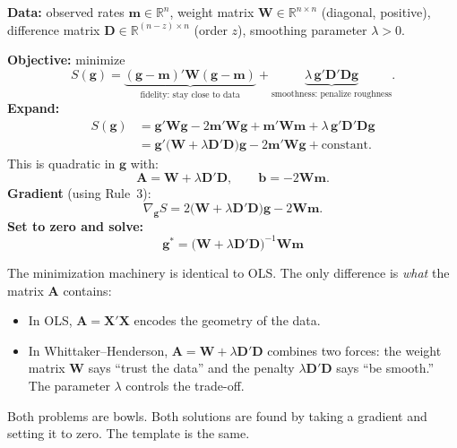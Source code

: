 \documentclass[11pt,a4paper]{article}
\begin{document}
\begin{formaldef}
\textbf{Data:} observed rates $\bm{m} \in \mathbb{R}^n$, weight matrix $\bm{W} \in \mathbb{R}^{n \times n}$ (diagonal, positive), difference matrix $\bm{D} \in \mathbb{R}^{(n-z) \times n}$ (order $z$), smoothing parameter $\lambda > 0$.

\textbf{Objective:} minimize
\[
S(\bm{g}) = \underbrace{(\bm{g} - \bm{m})'\bm{W}(\bm{g} - \bm{m})}_{\text{fidelity: stay close to data}} + \underbrace{\lambda\,\bm{g}'\bm{D}'\bm{D}\bm{g}}_{\text{smoothness: penalize roughness}}.
\]
\textbf{Expand:}
\begin{align*}
S(\bm{g}) &= \bm{g}'\bm{W}\bm{g} - 2\bm{m}'\bm{W}\bm{g} + \bm{m}'\bm{W}\bm{m} + \lambda\,\bm{g}'\bm{D}'\bm{D}\bm{g} \\
&= \bm{g}'\bigl(\bm{W} + \lambda\bm{D}'\bm{D}\bigr)\bm{g} - 2\bm{m}'\bm{W}\bm{g} + \text{constant}.
\end{align*}
This is quadratic in $\bm{g}$ with:
\[
\bm{A} = \bm{W} + \lambda\bm{D}'\bm{D}, \qquad \bm{b} = -2\bm{W}\bm{m}.
\]
\textbf{Gradient} (using Rule~3):
\[
\nabla_{\bm{g}} S = 2\bigl(\bm{W} + \lambda\bm{D}'\bm{D}\bigr)\bm{g} - 2\bm{W}\bm{m}.
\]
\textbf{Set to zero and solve:}
\[
\boxed{\bm{g}^* = \bigl(\bm{W} + \lambda\bm{D}'\bm{D}\bigr)^{-1}\bm{W}\bm{m}}
\]
\end{formaldef}

\begin{intuition}
The minimization machinery is identical to OLS. The only difference is \emph{what} the matrix $\bm{A}$ contains:
\begin{itemize}[nosep]
\item In OLS, $\bm{A} = \bm{X}'\bm{X}$ encodes the geometry of the data.
\item In Whittaker--Henderson, $\bm{A} = \bm{W} + \lambda\bm{D}'\bm{D}$ combines two forces: the weight matrix $\bm{W}$ says ``trust the data'' and the penalty $\lambda\bm{D}'\bm{D}$ says ``be smooth.'' The parameter $\lambda$ controls the trade-off.
\end{itemize}
Both problems are bowls. Both solutions are found by taking a gradient and setting it to zero. The template is the same.
\end{intuition}
\end{document}
